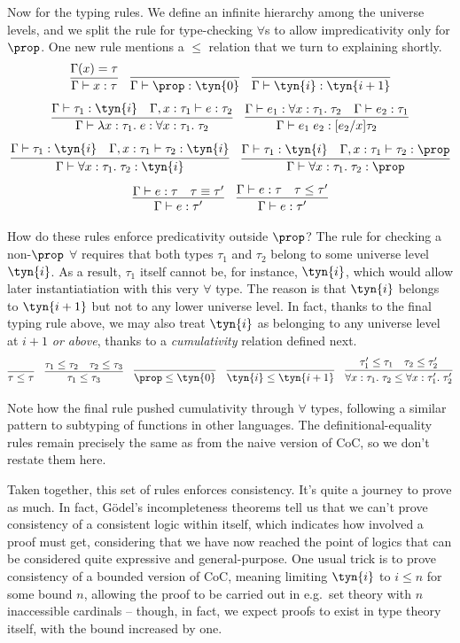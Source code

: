 \documentclass{amsbook}
\theoremstyle{definition}
\theoremstyle{remark}
\numberwithin{section}{chapter}
\numberwithin{equation}{chapter}
\begin{document}
Now for the typing rules.
We define an infinite hierarchy among the universe levels, and we split the rule for type-checking $\forall$s to allow impredicativity only for $\prop$.
One new rule mentions a $\leq$ relation that we turn to explaining shortly.
$$\infer{\hasty{\Gamma}{x}{\tau}}{
  \msel{\Gamma}{x} = \tau
}
\quad \infer{\hasty{\Gamma}{\prop}{\tyn{0}}}{}
\quad \infer{\hasty{\Gamma}{\tyn{i}}{\tyn{i+1}}}{}$$
$$\infer{\hasty{\Gamma}{\lambda x : \tau_1. \; e}{\forall x : \tau_1. \; \tau_2}}{
  \hasty{\Gamma}{\tau_1}{\tyn{i}}
  & \hasty{\Gamma, x : \tau_1}{e}{\tau_2}
}
\quad \infer{\hasty{\Gamma}{e_1 \; e_2}{\subst{\tau_2}{x}{e_2}}}{
  \hasty{\Gamma}{e_1}{\forall x : \tau_1. \; \tau_2}
  & \hasty{\Gamma}{e_2}{\tau_1}
}$$
$$\infer{\hasty{\Gamma}{\forall x : \tau_1. \; \tau_2}{\tyn{i}}}{
  \hasty{\Gamma}{\tau_1}{\tyn{i}}
  & \hasty{\Gamma, x : \tau_1}{\tau_2}{\tyn{i}}
}
\quad \infer{\hasty{\Gamma}{\forall x : \tau_1. \; \tau_2}{\prop}}{
  \hasty{\Gamma}{\tau_1}{\tyn{i}}
  & \hasty{\Gamma, x : \tau_1}{\tau_2}{\prop}
}$$
$$\infer{\hasty{\Gamma}{e}{\tau'}}{
  \hasty{\Gamma}{e}{\tau}
  & \tau \equiv \tau'
}
\quad \infer{\hasty{\Gamma}{e}{\tau'}}{
  \hasty{\Gamma}{e}{\tau}
  & \tau \leq \tau'
}$$

How do these rules enforce predicativity outside $\prop$?
The rule for checking a non-$\prop$ $\forall$ requires that both types $\tau_1$ and $\tau_2$ belong to some universe level $\tyn{i}$.
As a result, $\tau_1$ itself cannot be, for instance, $\tyn{i}$, which would allow later instantiatiation with this very $\forall$ type.
The reason is that $\tyn{i}$ belongs to $\tyn{i+1}$ but not to any lower universe level.
In fact, thanks to the final typing rule above, we may also treat $\tyn{i}$ as belonging to any universe level at $i+1$ \emph{or above}, thanks to a \emph{cumulativity} relation defined next.
$$\infer{\tau \leq \tau}{}
\quad \infer{\tau_1 \leq \tau_3}{
  \tau_1 \leq \tau_2
  & \tau_2 \leq \tau_3
}
\quad \infer{\prop \leq \tyn{0}}{}
\quad \infer{\tyn{i} \leq \tyn{i+1}}{}
\quad \infer{\forall x : \tau_1. \; \tau_2 \leq \forall x : \tau'_1. \; \tau'_2}{
  \tau'_1 \leq \tau_1
  & \tau_2 \leq \tau'_2
}$$

Note how the final rule pushed cumulativity through $\forall$ types, following a similar pattern to subtyping of functions in other languages.
The definitional-equality rules remain precisely the same as from the naive version of CoC, so we don't restate them here.

Taken together, this set of rules enforces consistency.
It's quite a journey to prove as much.
In fact, G\"odel's incompleteness theorems tell us that we can't prove consistency of a consistent logic within itself, which indicates how involved a proof must get, considering that we have now reached the point of logics that can be considered quite expressive and general-purpose.
One usual trick is to prove consistency of a bounded version of CoC, meaning limiting $\tyn{i}$ to $i \leq n$ for some bound $n$, allowing the proof to be carried out in e.g.\ set theory with $n$ inaccessible cardinals -- though, in fact, we expect proofs to exist in type theory itself, with the bound increased by one.
\end{document}
